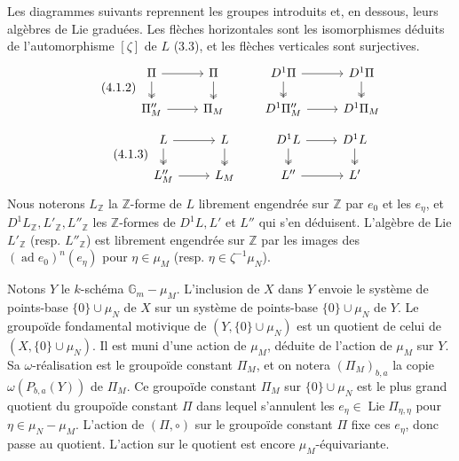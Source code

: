 \documentclass[10pt,a4paper]{article}
\newcommand{\Gm}{\mathbb G_m}
\newcommand{\Z}{\mathbb Z}
\newcommand{\Lie}{\operatorname{Lie}}
\newcommand{\ad}{\operatorname{ad}}
\theoremstyle{deligne}
\newcommand{\heading}[1]{\vspace{0.65em}\noindent{\bfseries #1}\quad}
\begin{document}
Les diagrammes suivants reprennent les groupes introduits et, en dessous, leurs algèbres de Lie graduées. Les flèches horizontales sont les isomorphismes déduits de l'automorphisme \([\zeta]\) de \(L\) (3.3), et les flèches verticales sont surjectives.
\[
\tag{4.1.2}
\begin{tikzcd}[column sep=2.5em,row sep=1.35em]
\Pi \arrow[r] \arrow[d,two heads] & \Pi \arrow[d,two heads]
& D^1\Pi \arrow[r] \arrow[d,two heads] & D^1\Pi \arrow[d,two heads]\\
\Pi_M^{\prime\prime} \arrow[r] & \Pi_M
& D^1\Pi_M^{\prime\prime} \arrow[r] & D^1\Pi_M
\end{tikzcd}
\]
\[
\tag{4.1.3}
\begin{tikzcd}[column sep=2.5em,row sep=1.35em]
L \arrow[r] \arrow[d,two heads] & L \arrow[d,two heads]
& D^1L \arrow[r] \arrow[d,two heads] & D^1L \arrow[d,two heads]\\
L_M^{\prime\prime} \arrow[r] & L_M
& L'' \arrow[r] & L'
\end{tikzcd}
\]
Nous noterons \(L_{\Z}\) la \(\Z\)-forme de \(L\) librement engendrée sur \(\Z\) par \(e_0\) et les \(e_\eta\), et \(D^1L_{\Z}, L'_{\Z}, L''_{\Z}\) les \(\Z\)-formes de \(D^1L,L'\) et \(L''\) qui s'en déduisent. L'algèbre de Lie \(L'_{\Z}\) (resp. \(L''_{\Z}\)) est librement engendrée sur \(\Z\) par les images des \((\ad e_0)^n(e_\eta)\) pour \(\eta\in\mu_M\) (resp. \(\eta\in\zeta^{-1}\mu_N\)).

\heading{4.2.} Notons \(Y\) le \(k\)-schéma \(\Gm-\mu_M\). L'inclusion de \(X\) dans \(Y\) envoie le système de points-base \(\{0\}\cup\mu_N\) de \(X\) sur un système de points-base \(\{0\}\cup\mu_N\) de \(Y\). Le groupoïde fondamental motivique de \((Y,\{0\}\cup\mu_N)\) est un quotient de celui de \((X,\{0\}\cup\mu_N)\). Il est muni d'une action de \(\mu_M\), déduite de l'action de \(\mu_M\) sur \(Y\). Sa \(\omega\)-réalisation est le groupoïde constant \(\Pi_M\), et on notera \((\Pi_M)_{b,a}\) la copie \(\omega(P_{b,a}(Y))\) de \(\Pi_M\). Ce groupoïde constant \(\Pi_M\) sur \(\{0\}\cup\mu_N\) est le plus grand quotient du groupoïde constant \(\Pi\) dans lequel s'annulent les \(e_\eta\in\Lie \Pi_{\eta,\eta}\) pour \(\eta\in\mu_N-\mu_M\). L'action de \((\Pi,\circ)\) sur le groupoïde constant \(\Pi\) fixe ces \(e_\eta\), donc passe au quotient. L'action sur le quotient est encore \(\mu_M\)-équivariante.
\end{document}

